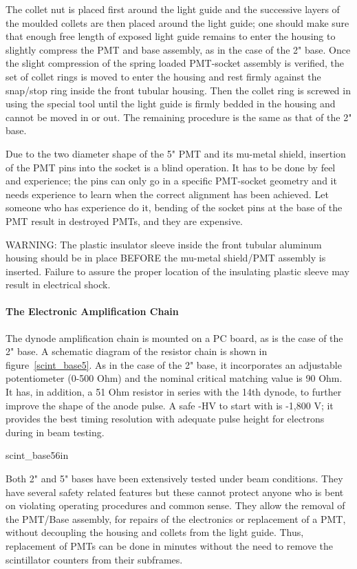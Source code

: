 The collet nut is placed first around the light guide and the successive layers 
of the moulded collets are then placed around the light guide; one should make 
sure that enough free length of exposed light guide remains to enter the 
housing to slightly compress the PMT and base assembly, as in the case of the 
2" base. Once the slight compression of the spring loaded PMT-socket assembly 
is verified, the set of collet rings is moved to enter the housing and rest 
firmly against the snap/stop ring inside the front tubular housing. Then the 
collet ring is screwed in using the special tool until the light guide is 
firmly bedded in the housing and cannot be moved in or out. The remaining 
procedure is the same as that of the 2" base.

Due to the two diameter shape of the 5" PMT and its mu-metal shield, insertion  
of the PMT pins into the socket is a blind operation. It has to be done by feel 
and experience; the pins can only go in a specific PMT-socket geometry and it 
needs experience to learn when the correct alignment has been achieved. Let 
someone who has experience do it, bending of the socket pins at the base of the 
PMT result in destroyed PMTs, and they are expensive.

WARNING: The plastic insulator sleeve inside the front tubular aluminum 
housing should be in place BEFORE the mu-metal shield/PMT assembly is inserted. 
Failure to assure the proper location of the insulating plastic sleeve may 
result in electrical shock.
 
\paragraph{The Electronic Amplification Chain}


The dynode amplification chain is mounted on a PC board, as is the case of the 
2" base. A schematic diagram of the resistor chain is shown in 
figure~\ref{scint_base5}. As in 
the case of the 2" base, it incorporates an adjustable potentiometer (0-500 
Ohm) and the nominal critical matching value is 90 Ohm. It has, in addition, a 
51 Ohm resistor in series with the 14th dynode, to further improve the shape of 
the anode pulse. A safe -HV to start with is -1,800 V; it provides the best 
timing resolution with adequate pulse height for electrons during in beam 
testing.

{scint_base5}{6in}


   Both 2" and 5" bases have been extensively tested under beam conditions. 
They have several safety related features but these cannot protect anyone who 
is bent on violating operating procedures and common sense. They allow the 
removal of the PMT/Base assembly, for repairs of the electronics or replacement 
of a PMT, without decoupling the housing and collets from the light guide. 
Thus, replacement of PMTs can be done in minutes without the need to remove the 
scintillator counters from their subframes.



